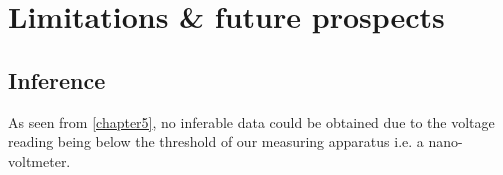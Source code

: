 \chapter{Limitations \& future prospects}

\label{chapter6}

\section{Inference}

As seen from \cref{chapter5}, no inferable data could be obtained due to the voltage reading being below the threshold of our measuring apparatus i.e. a nano-voltmeter.
